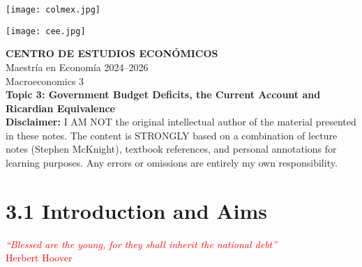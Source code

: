 \documentclass[12pt]{article}
\title{}
\author{}
\date{}
\begin{document}
\begin{titlepage}
    \vspace*{-1cm}
    \noindent
    \begin{minipage}[t]{0.49\textwidth}
        \texttt{[image: colmex.jpg]}
    \end{minipage}%
    \begin{minipage}[t]{0.49\textwidth}
        \raggedleft
        \texttt{[image: cee.jpg]}
    \end{minipage}

    \vspace*{2cm}

    \begin{center}
        \Huge \textbf{CENTRO DE ESTUDIOS ECONÓMICOS} \\[1.5em]
        \Large Maestría en Economía 2024--2026 \\[2em]
        \Large Macroeconomics 3 \\[3em]
        \LARGE \textbf{Topic 3: Government Budget Deficits, the Current
Account and Ricardian Equivalence} \\[3em]
        \large \textbf{Disclaimer:} I AM NOT the original intellectual author of the material presented in these notes. The content is STRONGLY based on a combination of lecture notes (Stephen McKnight), textbook references, and personal annotations for learning purposes. Any errors or omissions are entirely my own responsibility.\\[0.9em]
        
    \end{center}

    \vfill
\end{titlepage}

\newpage

\setcounter{secnumdepth}{2}
\setcounter{tocdepth}{3}
\tableofcontents

\newpage

\section*{\noindent\textbf{3.1 Introduction and Aims}}

\begin{center}
\textcolor{red}{\textit{``Blessed are the young, for they shall inherit the national debt''}}\\
\textcolor{red}{Herbert Hoover}
\end{center}
\end{document}
